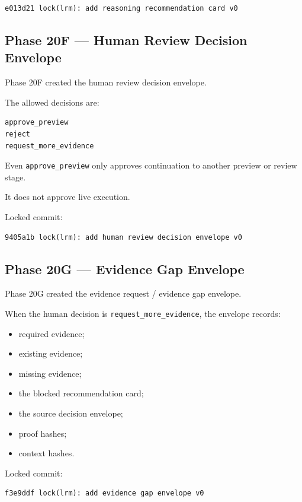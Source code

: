 \begin{verbatim}
e013d21 lock(lrm): add reasoning recommendation card v0
\end{verbatim}

\subsection{Phase 20F --- Human Review Decision Envelope}

Phase 20F created the human review decision envelope.

The allowed decisions are:

\begin{verbatim}
approve_preview
reject
request_more_evidence
\end{verbatim}

Even \texttt{approve\_preview} only approves continuation to another preview or review stage.

It does not approve live execution.

Locked commit:

\begin{verbatim}
9405a1b lock(lrm): add human review decision envelope v0
\end{verbatim}

\subsection{Phase 20G --- Evidence Gap Envelope}

Phase 20G created the evidence request / evidence gap envelope.

When the human decision is \texttt{request\_more\_evidence}, the envelope records:

\begin{itemize}
  \item required evidence;
  \item existing evidence;
  \item missing evidence;
  \item the blocked recommendation card;
  \item the source decision envelope;
  \item proof hashes;
  \item context hashes.
\end{itemize}

Locked commit:

\begin{verbatim}
f3e9ddf lock(lrm): add evidence gap envelope v0
\end{verbatim}

